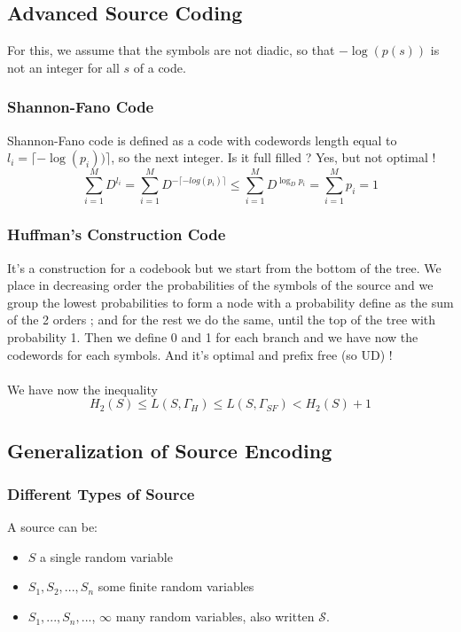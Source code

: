 \documentclass{article}
\begin{document}
\subsection{Advanced Source Coding}
For this, we assume that the symbols are not diadic, so that $ -\log(p(s)) $ is not an integer for all $ s $ of a code.

\subsubsection{Shannon-Fano Code} Shannon-Fano code is defined as a code with codewords length equal to $ l_i = \lceil -\log(p_i)) \rceil $, so the next integer. Is it full filled ? Yes, but not optimal !
\begin{equation}
\sum_{i=1}^{M}D^{l_i} = \sum_{i=1}^{M}D^{-\lceil -log(p_i) \rceil} \leq \sum_{i=1}^{M}D^{\log_{D}p_i} = \sum_{i=1}^{M}p_i = 1
\end{equation} 

\subsubsection{Huffman's Construction Code} It's a construction for a codebook but we start from the bottom of the tree. We place in decreasing order the probabilities of the symbols of the source and we group the lowest probabilities to form a node with a probability define as the sum of the 2 orders ; and for the rest we do the same, until the top of the tree with probability 1. Then we define 0 and 1 for each branch and we have now the codewords for each symbols. And it's optimal and prefix free (so UD) !
\\
\\
We have now the inequality
\begin{equation}
H_2(S) \leq L(S, \Gamma_{H}) \leq L(S, \Gamma_{SF}) < H_2(S) + 1
\end{equation}

\subsection{Generalization of Source Encoding}
\subsubsection{Different Types of Source} A source can be:
\begin{itemize}
\item $ S $ a single random variable
\item $ S_1,S_2,...,S_n $ some finite random variables
\item $ S_1,...,S_n,...  $, $ \infty $ many random variables, also written $ \mathcal{S} $.
\end{itemize}
\end{document}
